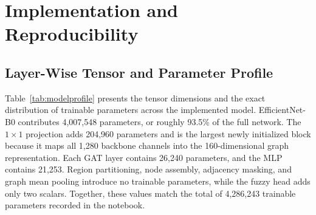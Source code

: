 \documentclass[10pt,conference]{IEEEtran}
\begin{document}
\section{Implementation and Reproducibility}

\subsection{Layer-Wise Tensor and Parameter Profile}
Table~\ref{tab:modelprofile} presents the tensor dimensions and the exact distribution of trainable parameters across the implemented model. EfficientNet-B0 contributes 4,007,548 parameters, or roughly 93.5\% of the full network. The $1\times1$ projection adds 204,960 parameters and is the largest newly initialized block because it maps all 1,280 backbone channels into the 160-dimensional graph representation. Each GAT layer contains 26,240 parameters, and the MLP contains 21,253. Region partitioning, node assembly, adjacency masking, and graph mean pooling introduce no trainable parameters, while the fuzzy head adds only two scalars. Together, these values match the total of 4,286,243 trainable parameters recorded in the notebook.
\end{document}
